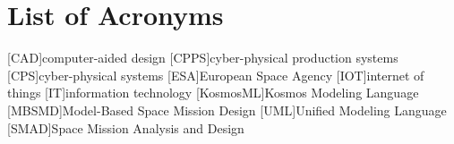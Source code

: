 \chapter*{List of Acronyms}
\begin{acronym}
    [CAD]{computer-aided design}
    [CPPS]{cyber-physical production systems}
    [CPS]{cyber-physical systems}
    [ESA]{European Space Agency}
    [IOT]{internet of things}
    [IT]{information technology}
    [KosmosML]{Kosmos Modeling Language}
    [MBSMD]{Model-Based Space Mission Design}
    [UML]{Unified Modeling Language}
    [SMAD]{Space Mission Analysis and Design}
\end{acronym}

